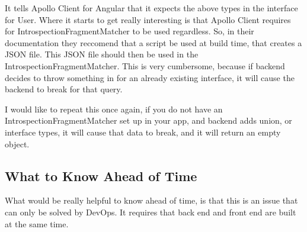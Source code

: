It tells Apollo Client for Angular that it expects the above types in the
interface for User. Where it starts to get really interesting is that Apollo
Client requires for IntrospectionFragmentMatcher to be used regardless. So, in
their documentation they reccomend that a script be used at build time, that
creates a JSON file. This JSON file should then be used in the
IntrospectionFragmentMatcher. This is very cumbersome, because if backend
decides to throw something in for an already existing interface, it will cause
the backend to break for that query.

I would like to repeat this once again, if you do not have an
IntrospectionFragmentMatcher set up in your app, and backend adds union, or
interface types, it will cause that data to break, and it will return an empty
object.


\subsection{ What to Know Ahead of Time }
What would be really helpful to know ahead of time, is that this is an issue
that can only be solved by DevOps. It requires that back end and front end are
built at the same time.
